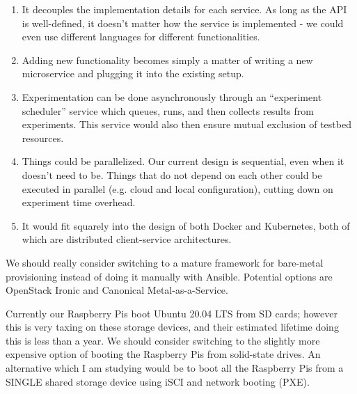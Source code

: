 \begin{description}[wide,style=nextline]
    \begin{enumerate}
        \item It decouples the implementation details for each service.
        As long as the \gls{API} is well-defined, it doesn't matter how the service is implemented - we could even use different languages for different functionalities.
        \item Adding new functionality becomes simply a matter of writing a new microservice and plugging it into the existing setup.
        \item Experimentation can be done asynchronously through an ``experiment scheduler'' service which queues, runs, and then collects results from experiments.
        This service would also then ensure mutual exclusion of testbed resources.
        \item Things could be parallelized.
        Our current design is sequential, even when it doesn't need to be.
        Things that do not depend on each other could be executed in parallel (e.g. cloud and local configuration), cutting down on experiment time overhead.
        \item It would fit squarely into the design of both Docker and Kubernetes, both of which are distributed client-service architectures.
    \end{enumerate}

    \item[OpenStack/Canonical MaaS]
    
    We should really consider switching to a mature framework for bare-metal provisioning instead of doing it manually with Ansible.
    Potential options are OpenStack Ironic and Canonical Metal-as-a-Service.

    \item[Raspberry Pi SSDs]
        
    Currently our Raspberry Pis boot Ubuntu 20.04 LTS from SD cards; however this is very taxing on these storage devices, and their estimated lifetime doing this is less than a year.
    We should consider switching to the slightly more expensive option of booting the Raspberry Pis from solid-state drives.
    An alternative which I am studying would be to boot all the Raspberry Pis from a SINGLE shared storage device using iSCI and network booting (PXE). 

\end{description}

